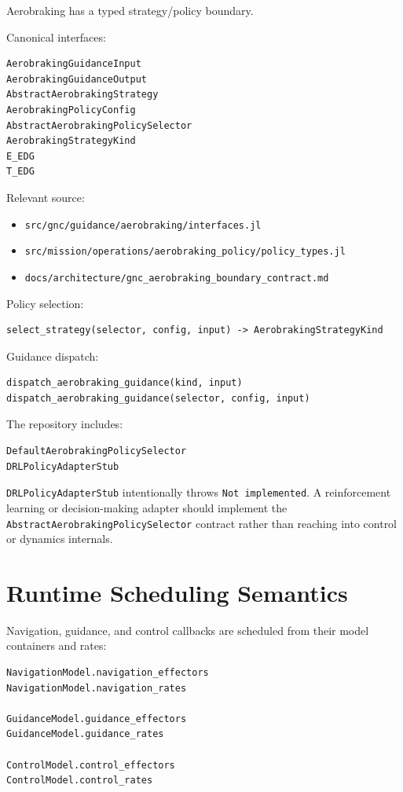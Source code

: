 \documentclass[11pt]{article}
\begin{document}
Aerobraking has a typed strategy/policy boundary.

Canonical interfaces:

\begin{lstlisting}
AerobrakingGuidanceInput
AerobrakingGuidanceOutput
AbstractAerobrakingStrategy
AerobrakingPolicyConfig
AbstractAerobrakingPolicySelector
AerobrakingStrategyKind
E_EDG
T_EDG
\end{lstlisting}

Relevant source:
\begin{itemize}
  \item \texttt{src/gnc/guidance/aerobraking/interfaces.jl}
  \item \texttt{src/mission/operations/aerobraking\_policy/policy\_types.jl}
  \item \texttt{docs/architecture/gnc\_aerobraking\_boundary\_contract.md}
\end{itemize}

Policy selection:

\begin{lstlisting}
select_strategy(selector, config, input) -> AerobrakingStrategyKind
\end{lstlisting}

Guidance dispatch:

\begin{lstlisting}
dispatch_aerobraking_guidance(kind, input)
dispatch_aerobraking_guidance(selector, config, input)
\end{lstlisting}

The repository includes:

\begin{lstlisting}
DefaultAerobrakingPolicySelector
DRLPolicyAdapterStub
\end{lstlisting}

\texttt{DRLPolicyAdapterStub} intentionally throws \texttt{Not implemented}. A
reinforcement learning or decision-making adapter should implement the
\texttt{AbstractAerobrakingPolicySelector} contract rather than reaching into
control or dynamics internals.

\section{Runtime Scheduling Semantics}

Navigation, guidance, and control callbacks are scheduled from their model
containers and rates:

\begin{lstlisting}
NavigationModel.navigation_effectors
NavigationModel.navigation_rates

GuidanceModel.guidance_effectors
GuidanceModel.guidance_rates

ControlModel.control_effectors
ControlModel.control_rates
\end{lstlisting}
\end{document}
